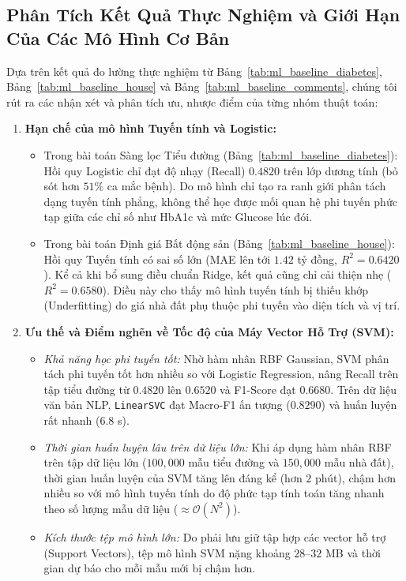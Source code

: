 \documentclass[12pt,a4paper]{report}
\begin{document}
\subsection{Phân Tích Kết Quả Thực Nghiệm và Giới Hạn Của Các Mô Hình Cơ Bản}

Dựa trên kết quả đo lường thực nghiệm từ Bảng~\ref{tab:ml_baseline_diabetes}, Bảng~\ref{tab:ml_baseline_house} và Bảng~\ref{tab:ml_baseline_comments}, chúng tôi rút ra các nhận xét và phân tích ưu, nhược điểm của từng nhóm thuật toán:
\begin{enumerate}[leftmargin=1.2cm]
    \item \textbf{Hạn chế của mô hình Tuyến tính và Logistic:}
    \begin{itemize}
        \item Trong bài toán Sàng lọc Tiểu đường (Bảng~\ref{tab:ml_baseline_diabetes}): Hồi quy Logistic chỉ đạt độ nhạy (Recall) $0.4820$ trên lớp dương tính (bỏ sót hơn $51\%$ ca mắc bệnh). Do mô hình chỉ tạo ra ranh giới phân tách dạng tuyến tính phẳng, không thể học được mối quan hệ phi tuyến phức tạp giữa các chỉ số như HbA1c và mức Glucose lúc đói.
        \item Trong bài toán Định giá Bất động sản (Bảng~\ref{tab:ml_baseline_house}): Hồi quy Tuyến tính có sai số lớn (MAE lên tới $1.42$ tỷ đồng, $R^2 = 0.6420$). Kể cả khi bổ sung điều chuẩn Ridge, kết quả cũng chỉ cải thiện nhẹ ($R^2 = 0.6580$). Điều này cho thấy mô hình tuyến tính bị thiếu khớp (Underfitting) do giá nhà đất phụ thuộc phi tuyến vào diện tích và vị trí.
    \end{itemize}
    \item \textbf{Ưu thế và Điểm nghẽn về Tốc độ của Máy Vector Hỗ Trợ (SVM):}
    \begin{itemize}
        \item \textit{Khả năng học phi tuyến tốt:} Nhờ hàm nhân RBF Gaussian, SVM phân tách phi tuyến tốt hơn nhiều so với Logistic Regression, nâng Recall trên tập tiểu đường từ $0.4820$ lên $0.6520$ và F1-Score đạt $0.6680$. Trên dữ liệu văn bản NLP, \texttt{LinearSVC} đạt Macro-F1 ấn tượng ($0.8290$) và huấn luyện rất nhanh ($6.8$ s).
        \item \textit{Thời gian huấn luyện lâu trên dữ liệu lớn:} Khi áp dụng hàm nhân RBF trên tập dữ liệu lớn ($100,000$ mẫu tiểu đường và $150,000$ mẫu nhà đất), thời gian huấn luyện của SVM tăng lên đáng kể (hơn $2$ phút), chậm hơn nhiều so với mô hình tuyến tính do độ phức tạp tính toán tăng nhanh theo số lượng mẫu dữ liệu ($\approx \mathcal{O}(N^2)$).
        \item \textit{Kích thước tệp mô hình lớn:} Do phải lưu giữ tập hợp các vector hỗ trợ (Support Vectors), tệp mô hình SVM nặng khoảng $28$--$32$ MB và thời gian dự báo cho mỗi mẫu mới bị chậm hơn.

\end{itemize}
\end{enumerate}
\end{document}
